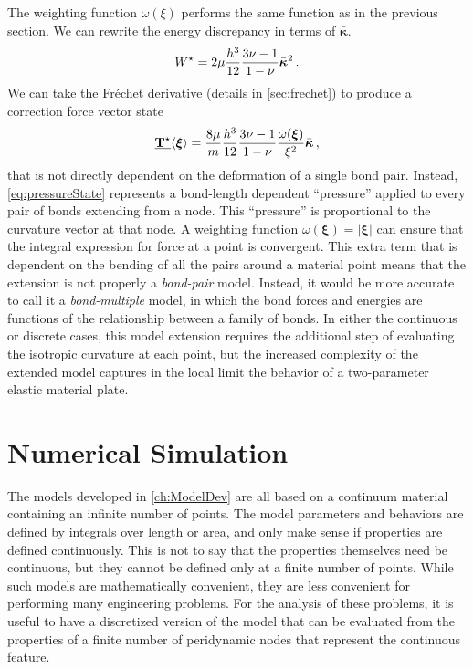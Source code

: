 %
The weighting function \(\omega(\xi)\) performs the same function as in the previous section.
We can rewrite the energy discrepancy in terms of \(\bar{\boldsymbol{\kappa}}\).
%
\begin{equation}
    W^\star=2\mu\frac{h^3}{12}\frac{3\nu-1}{1-\nu}\bar{\boldsymbol{\kappa}}^2\, . \notag
\end{equation}
%
We can take the Fr\'{e}chet derivative (details in \ref{sec:frechet}) to produce a correction force vector state
%
\begin{equation}
    \vstate{T^\star}{}{\boldsymbol{\xi}}=\frac{8\mu}{m}\frac{h^3}{12}\frac{3\nu-1}{1-\nu}\frac{\omega(\boldsymbol{\xi})}{\xi^2} \bar{\boldsymbol{\kappa}}\, ,
    \label{eq:pressureState}
\end{equation}
%
that is not directly dependent on the deformation of a single bond pair.  Instead, \cref{eq:pressureState} represents a bond-length dependent ``pressure'' applied to every pair of bonds extending from a node.  This ``pressure'' is proportional to the curvature vector at that node.
A weighting function \(\omega(\boldsymbol{\xi}) = |\boldsymbol{\xi}|\) can ensure that the integral expression for force at a point is convergent.  This extra term that is dependent on the bending of all the pairs around a material point means that the extension is not properly a \textit{bond-pair} model.  Instead, it would be more accurate to call it a \textit{bond-multiple} model, in which the bond forces and energies are functions of the relationship between a family of bonds.  In either the continuous or discrete cases, this model extension requires the additional step of evaluating the isotropic curvature at each point, but the increased complexity of the extended model captures in the local limit the behavior of a two-parameter elastic material plate.
%
\chapter{Numerical Simulation}
\label{ch:NumericalSimulation}
The models developed in \cref{ch:ModelDev} are all based on a continuum material containing an infinite number of points.
The model parameters and behaviors are defined by integrals over length or area, and only make sense if properties are defined continuously.
This is not to say that the properties themselves need be continuous, but they cannot be defined only at a finite number of points.
While such models are mathematically convenient, they are less convenient for performing many engineering problems.
For the analysis of these problems, it is useful to have a discretized version of the model that can be evaluated from the properties of a finite number of peridynamic nodes that represent the continuous feature.

